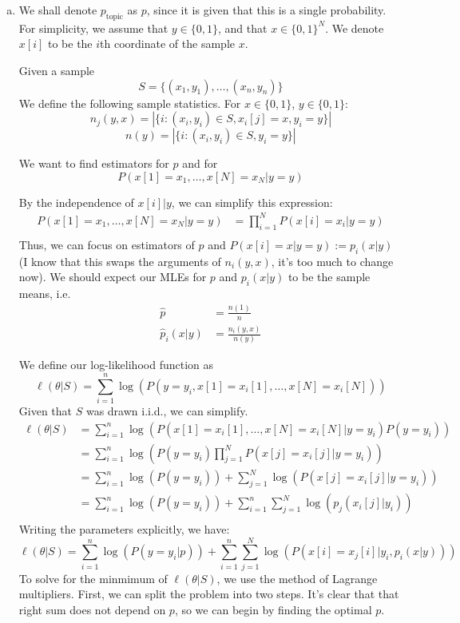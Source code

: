 \documentclass{amsart}
\theoremstyle{definition}
\begin{document}
\begin{enumerate}[(a)]
  	\item 
		We shall denote $p_{\mathrm{topic}}$ as $p$, since it is given that this is a single probability. 
		For simplicity, we assume that $y \in \{0, 1\}$, and that $x \in \{0, 1\}^N$.
		We denote $x[i]$ to be the $i$th coordinate of the sample $x$. 

		Given a sample 
		\[
		S = \{(x_1,y_1), \ldots, (x_n, y_n)\}
		\]
		We define the following sample statistics. For $x \in \{0,1\}$, $y \in \{0,1\}$:
		\[n_j(y, x) = |\{i : (x_i, y_i)\in S, x_i[j] = x, y_i = y\}|\]
		\[n(y) = |\{i : (x_i, y_i)\in S, y_i = y\}|\]

		We want to find estimators for $p$ and for  
		\[P(x[1] = x_1, \ldots, x[N] = x_N | y = y)\]

		By the independence of $x[i] | y$, we can simplify this expression:
		\begin{align*}
			P(x[1] = x_1, \ldots, x[N] = x_N | y = y) &= \prod_{i=1}^N P(x[i] = x_i | y = y)\\
		\end{align*}
		Thus, we can focus on estimators of $p$ and $P(x[i] = x | y = y) := p_i(x|y)$ (I know that this swaps the arguments of $n_i(y, x)$, it's too much to change now).
		We should expect our MLEs for $p$ and $p_i(x|y)$ to be the sample means, i.e. 
		\begin{align*}
		\hat{p} &= \frac{n(1)}{n}\\
		\hat{p}_i(x|y) &= \frac{n_i(y, x)}{n(y)}
		\end{align*}
		
		We define our log-likelihood function as
		\[\ell(\theta|S) = \sum_{i=1}^{n}\log(P(y = y_i, x[1] = x_i[1], \ldots, x[N] = x_i[N] )) \]
		Given that $S$ was drawn i.i.d., we can simplify.
		\begin{align*}
			\ell(\theta|S) &= \sum_{i=1}^{n}\log(P(x[1] = x_i[1], \ldots, x[N] = x_i[N] | y = y_i)P(y = y_i))  \\
			&= \sum_{i=1}^{n}\log(P(y=y_i)\prod_{j=1}^{N} P(x[j] = x_i[j]|y = y_i))\\
			&= \sum_{i=1}^{n}\log(P(y = y_i)) + \sum_{j=1}^{N} \log(P(x[j] = x_i[j]|y = y_i))\\
			&= \sum_{i=1}^{n}\log(P(y = y_i)) + \sum_{i=1}^{n}\sum_{j=1}^{N} \log(p_j(x_i[j]|y_i))\\
		\end{align*}
		Writing the parameters explicitly, we have:
		\[
		\ell(\theta|S) = \sum_{i=1}^{n}\log(P(y = y_i|p)) + \sum_{i=1}^{n}\sum_{j=1}^{N} \log(P(x[i] = x_j[i]| y_i, p_i(x|y)))
		\]
		To solve for the minmimum of $\ell(\theta|S)$, we use the method of Lagrange multipliers. 
		First, we can split the problem into two steps. It's clear that that right sum does not depend on $p$, 
		so we can begin by finding the optimal $p$.


\end{enumerate}
\end{document}
